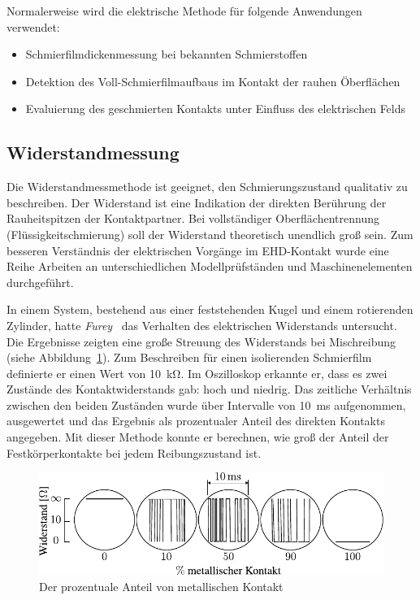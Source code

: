 Normalerweise wird die elektrische Methode für folgende Anwendungen verwendet:


\begin{itemize}
    \item Schmierfilmdickenmessung bei bekannten Schmierstoffen
    \item Detektion des Voll-Schmierfilmaufbaus im Kontakt der rauhen Öberflächen
    \item Evaluierung des geschmierten Kontakts unter Einfluss des elektrischen Felds
\end{itemize}

\subsection{Widerstandmessung}
\label{sub:wiederstandmessung}

Die Widerstandmessmethode ist geeignet, den Schmierungszustand qualitativ zu beschreiben.
Der Widerstand ist eine Indikation der direkten Berührung der Rauheitspitzen der Kontaktpartner.
Bei vollständiger Oberflächentrennung (Flüssigkeitschmierung) soll der Widerstand theoretisch unendlich groß sein.
Zum besseren Verständnis der elektrischen Vorgänge im EHD-Kontakt wurde eine Reihe Arbeiten an unterschiedlichen Modellprüfständen und Maschinenelementen durchgeführt.

In einem System, bestehend aus einer feststehenden Kugel und einem rotierenden Zylinder, hatte \textit{Furey}~\cite{furey_1961} das Verhalten des elektrischen Widerstands untersucht.
Die Ergebnisse zeigten eine große Streuung des Widerstands bei Mischreibung (siehe Abbildung~\ref{fig:resistance_vs_time_furey}).
Zum Beschreiben für einen isolierenden Schmierfilm definierte er einen Wert von \SI{10}{\kilo\ohm}.
Im Oszilloskop erkannte er, dass es zwei Zustände des Kontaktwiderstands gab: hoch und niedrig.
Das zeitliche Verhältnis zwischen den beiden Zuständen wurde über Intervalle von \SI{10}{\milli\second} aufgenommen, ausgewertet und das Ergebnis als prozentualer Anteil des direkten Kontakts angegeben.
Mit dieser Methode konnte er berechnen, wie groß der Anteil der Festkörperkontakte bei jedem Reibungszustand ist.

\begin{figure}[htb]
    \centering
    \includegraphics[]{./images/resistance_vs_time_furey.pdf}
    \caption{Der prozentuale Anteil von metallischen Kontakt~\cite{furey_1961}}
    \label{fig:resistance_vs_time_furey}
\end{figure}

